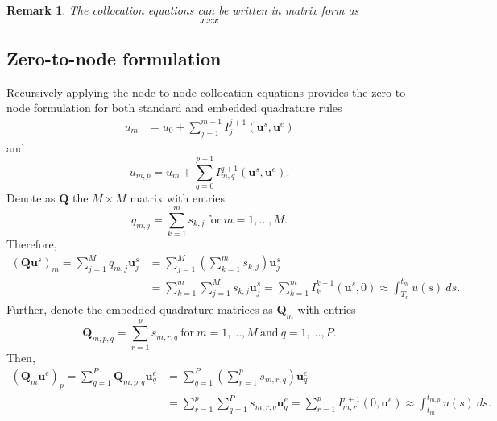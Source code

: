 \documentclass{article}
\newtheorem{remark}{Remark}
\newcommand{\ve}[1]{\mathbf{#1}}
\begin{document}
%
%
\begin{remark}
The collocation equations can be written in matrix form as
\begin{equation}
	xxx
\end{equation}
\end{remark}

\subsection*{Zero-to-node formulation}
Recursively applying the node-to-node collocation equations provides the zero-to-node formulation for both standard and embedded quadrature rules
\begin{align*}
	u_m &= u_0 + \sum_{j=1}^{m-1} I_{j}^{j+1}\left( \ve{u}^s, \ve{u}^e \right) 
\end{align*}
and
\begin{equation}
	u_{m,p} = u_m + \sum_{q=0}^{p-1} I_{m,q}^{q+1}\left( \ve{u}^s, \ve{u}^e \right).
\end{equation}
Denote as $\ve{Q}$ the $M \times M$ matrix with entries
\begin{equation}
	q_{m,j} = \sum_{k=1}^{m} s_{k,j} \ \text{for} \ m=1,\ldots, M.
\end{equation}
Therefore,
\begin{align*}
	\left( \ve{Q} \ve{u}^s \right)_m = \sum_{j=1}^{M} q_{m,j} \ve{u}^s_j &= \sum_{j=1}^{M} \left( \sum_{k=1}^{m} s_{k,j} \right) \ve{u}^s_j \\
		&= \sum_{k=1}^{m} \sum_{j=1}^{M} s_{k,j} \ve{u}^s_j = \sum_{k=1}^{m} I_{k}^{k+1}\left( \ve{u}^s, 0 \right) \approx \int_{T_n}^{t_m} u(s)~ds.
\end{align*}
Further, denote the embedded quadrature matrices as $\ve{Q}_m$ with entries
\begin{equation}
	\ve{Q}_{m,p,q} = \sum_{r=1}^{p} s_{m,r,q} \ \text{for} \ m=1,\ldots,M \ \text{and} \ q=1,\ldots,P.
\end{equation}
Then,
\begin{align*}
	\left( \ve{Q}_m \ve{u}^e \right)_{p} = \sum_{q=1}^{P} \ve{Q}_{m,p,q} \ve{u}^e_{q} &= \sum_{q=1}^{P} \left( \sum_{r=1}^{p} s_{m,r,q} \right) \ve{u}^e_{q} \\
		&= \sum_{r=1}^{p} \sum_{q=1}^{P} s_{m,r,q} \ve{u}^e_{q} = \sum_{r=1}^{p} I_{m,r}^{r+1}\left( 0, \ve{u}^e\right) \approx \int_{t_{m}}^{t_{m,p}} u(s)~ds.
\end{align*}
\end{document}
